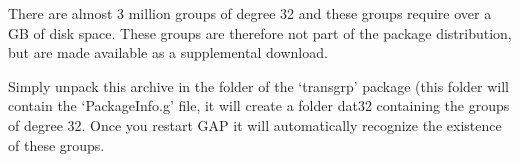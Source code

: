 
There are almost 3 million groups of degree 32 and these groups require over
a GB of disk space. These groups are therefore not part of the package
distribution, but are made available as a supplemental download.



Simply unpack this archive in the folder of the `transgrp' package (this
folder will contain the `PackageInfo.g' file, it will create a folder dat32
containing the groups of degree 32. Once you restart GAP it will
automatically recognize the existence of these groups.
